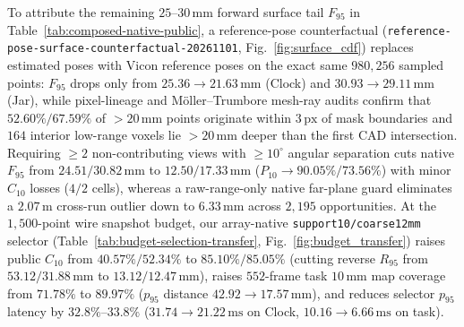 \documentclass[10pt,journal]{IEEEtran}
\begin{document}


\begin{table}[t]\centering\scriptsize
\caption{\textbf{CausalPose-3D} composed native repairs (RANSAC determinism + exact inverse-pose coefficient transfer + guarded \texttt{NO\_BA} retirement) vs. historical frozen BundleTrack on Laval Clock-full and Cookiejar. Strict: $\le 10\,\mathrm{mm}$ and $\le 10^\circ$.}\label{tab:composed-native-public}
\end{table}

To attribute the remaining $25$--$30\,\mathrm{mm}$ forward surface tail $F_{95}$ in Table~\ref{tab:composed-native-public}, a reference-pose counterfactual (\texttt{reference-pose-surface-counterfactual-20261101}, Fig.~\ref{fig:surface_cdf}) replaces estimated poses with Vicon reference poses on the exact same $980{,}256$ sampled points: $F_{95}$ drops only from $25.36\to 21.63\,\mathrm{mm}$ (Clock) and $30.93\to 29.11\,\mathrm{mm}$ (Jar), while pixel-lineage and M\"oller--Trumbore mesh-ray audits confirm that $52.60\%/67.59\%$ of $>20\,\mathrm{mm}$ points originate within $3\,\mathrm{px}$ of mask boundaries and $164$ interior low-range voxels lie $>20\,\mathrm{mm}$ deeper than the first CAD intersection. Requiring $\ge 2$ non-contributing views with $\ge 10^\circ$ angular separation cuts native $F_{95}$ from $24.51/30.82\,\mathrm{mm}$ to $12.50/17.33\,\mathrm{mm}$ ($P_{10}\to 90.05\%/73.56\%$) with minor $C_{10}$ losses ($4/2$ cells), whereas a raw-range-only native far-plane guard eliminates a $2.07\,\mathrm{m}$ cross-run outlier down to $6.33\,\mathrm{mm}$ across $2{,}195$ opportunities. At the $1{,}500$-point wire snapshot budget, our array-native \texttt{support10/coarse12mm} selector (Table~\ref{tab:budget-selection-transfer}, Fig.~\ref{fig:budget_transfer}) raises public $C_{10}$ from $40.57\%/52.34\%$ to $\mathbf{85.10\%/85.05\%}$ (cutting reverse $R_{95}$ from $53.12/31.88\,\mathrm{mm}$ to $13.12/12.47\,\mathrm{mm}$), raises $552$-frame task $10\,\mathrm{mm}$ map coverage from $71.78\%$ to $\mathbf{89.97\%}$ ($p_{95}$ distance $42.92\to 17.57\,\mathrm{mm}$), and reduces selector $p_{95}$ latency by $32.8\%$--$33.8\%$ ($31.74\to 21.22\,\mathrm{ms}$ on Clock, $10.16\to 6.66\,\mathrm{ms}$ on task).
\end{document}
